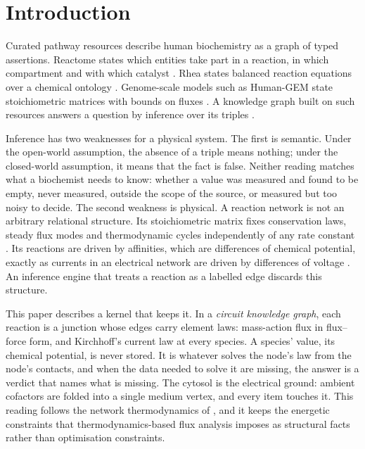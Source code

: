 \section{Introduction}
\label{sec:intro}

Curated pathway resources describe human biochemistry as a graph of typed assertions.
Reactome states which entities take part in a reaction, in which compartment and with which catalyst \citep{gillespie2022reactome}.
Rhea states balanced reaction equations over a chemical ontology \citep{bansal2022rhea}.
Genome-scale models such as Human-GEM state stoichiometric matrices with bounds on fluxes \citep{robinson2020humangem}.
A knowledge graph built on such resources answers a question by inference over its triples \citep{hogan2021knowledge}.

Inference has two weaknesses for a physical system.
The first is semantic.
Under the open-world assumption, the absence of a triple means nothing; under the closed-world assumption, it means that the fact is false.
Neither reading matches what a biochemist needs to know: whether a value was measured and found to be empty, never measured, outside the scope of the source, or measured but too noisy to decide.
The second weakness is physical.
A reaction network is not an arbitrary relational structure.
Its stoichiometric matrix fixes conservation laws, steady flux modes and thermodynamic cycles independently of any rate constant \citep{feinberg2019foundations,schuster1994efm}.
Its reactions are driven by affinities, which are differences of chemical potential, exactly as currents in an electrical network are driven by differences of voltage \citep{oster1971network,schnakenberg1976network}.
An inference engine that treats a reaction as a labelled edge discards this structure.

This paper describes a kernel that keeps it.
In a \emph{circuit knowledge graph}, each reaction is a junction whose edges carry element laws: mass-action flux in flux--force form, and Kirchhoff's current law at every species.
A species' value, its chemical potential, is never stored.
It is whatever solves the node's law from the node's contacts, and when the data needed to solve it are missing, the answer is a verdict that names what is missing.
The cytosol is the electrical ground: ambient cofactors are folded into a single medium vertex, and every item touches it.
This reading follows the network thermodynamics of \citet{oster1971network}, and it keeps the energetic constraints that thermodynamics-based flux analysis imposes \citep{beard2002energy,henry2007tfba} as structural facts rather than optimisation constraints.

